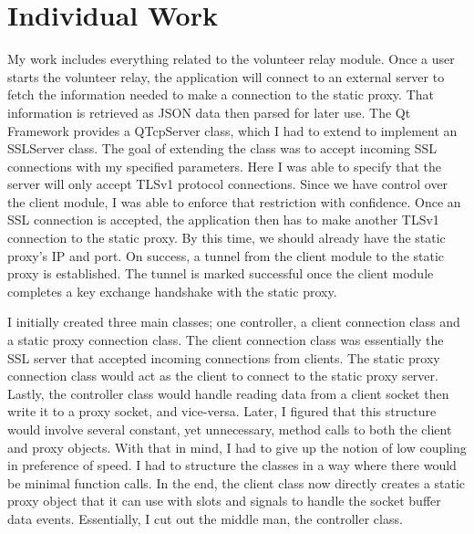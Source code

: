 \documentclass[12pt,a4paper]{report}
\begin{document}
	\section{Individual Work}
	My work includes everything related to the volunteer relay module. Once a user starts the volunteer relay, the application will connect to an external server to fetch the information needed to make a connection to the static proxy. That information is retrieved as JSON data then parsed for later use. The Qt Framework provides a QTcpServer class, which I had to extend to implement an SSLServer class. The goal of extending the class was to accept incoming SSL connections with my specified parameters. Here I was able to specify that the server will only accept TLSv1 protocol connections. Since we have control over the client module, I was able to enforce that restriction with confidence. Once an SSL connection is accepted, the application then has to make another TLSv1 connection to the static proxy. By this time, we should already have the static proxy's IP and port. On success, a tunnel from the client module to the static proxy is established. The tunnel is marked successful once the client module completes a key exchange handshake with the static proxy. 
	
	I initially created three main classes; one controller, a client connection class and a static proxy connection class. The client connection class was essentially the SSL server that accepted incoming connections from clients. The static proxy connection class would act as the client to connect to the static proxy server. Lastly, the controller class would handle reading data from a client socket then write it to a proxy socket, and vice-versa. Later, I figured that this structure would involve several constant, yet unnecessary, method calls to both the client and proxy objects. With that in mind, I had to give up the notion of low coupling in preference of speed. I had to structure the classes in a way where there would be minimal function calls. In the end, the client class now directly creates a static proxy object that it can use with slots and signals to handle the socket buffer data events. Essentially, I cut out the middle man, the controller class.       
	
\end{document}
